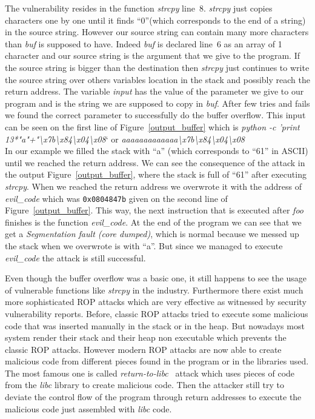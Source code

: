 \documentclass[11pt]{sdm}
\begin{document}
The vulnerability resides in the function \textit{strcpy} line~8. \textit{strcpy} just copies characters one by one until it finds ``0''(which corresponds to the end of a string) in the source string. However our source string can contain many more characters than \textit{buf} is supposed to have. 
Indeed \textit{buf} is declared line~6 as an array of 1 character and our source string is the argument that we give to the program.
If the source string is bigger than the destination then \textit{strcpy} just continues to write the source string over others variables location in the stack and possibly reach the return address.
The variable \textit{input} has the value of the parameter we give to our program and is the string we are supposed to copy in \textit{buf}.
After few tries and fails we found the correct parameter to successfully do the buffer overflow. This input can be seen on the first line of Figure~\ref{output_buffer} which is \textit{python -c 'print 13*"a"+"\textbackslash{x7b}\textbackslash{x84}\textbackslash{x04}\textbackslash{x08}}` or \textit{aaaaaaaaaaaaa\textbackslash{x7b}\textbackslash{x84}\textbackslash{x04}\textbackslash{x08}}\\
In our example we filled the stack with ``a'' (which corresponds to ``61'' in ASCII) until we reached the return address.
We can see the consequence of the attack in the output Figure~\ref{output_buffer}, where the stack is full of ``61'' after executing \textit{strcpy}.
When we reached the return address we overwrote it with the address of \textit{evil\_code} which was \texttt{0x0804847b} given on the second line of Figure~\ref{output_buffer}.
This way, the next instruction that is executed after \textit{foo} finishes is the function \textit{evil\_code}.
At the end of the program we can see that we get a \textit{Segmentation fault (core dumped)}, which is normal because we messed up the stack when we overwrote is with ``a''. But since we managed to execute \textit{evil\_code} the attack is still successful. \hfill \break

Even though the buffer overflow was a basic one, it still happens to see the usage of vulnerable functions like \textit{strcpy} in the industry.
Furthermore there exist much more sophisticated ROP attacks which are very effective as witnessed by security vulnerability reports.
Before, classic ROP attacks tried to execute some malicious code that was inserted manually in the stack or in the heap. But nowadays most system render their stack and their heap non executable which prevents the classic ROP attacks.
However modern ROP attacks are now able to create malicious code from different pieces found in the program or in the libraries used. The most famous one is called \textit{return-to-libc}~\cite{BRSS08}\cite{S07} attack which uses pieces of code from the \textit{libc} library to create malicious code. Then the attacker still try to deviate the control flow of the program through return addresses to execute the malicious code just assembled with \textit{libc} code.
\end{document}
